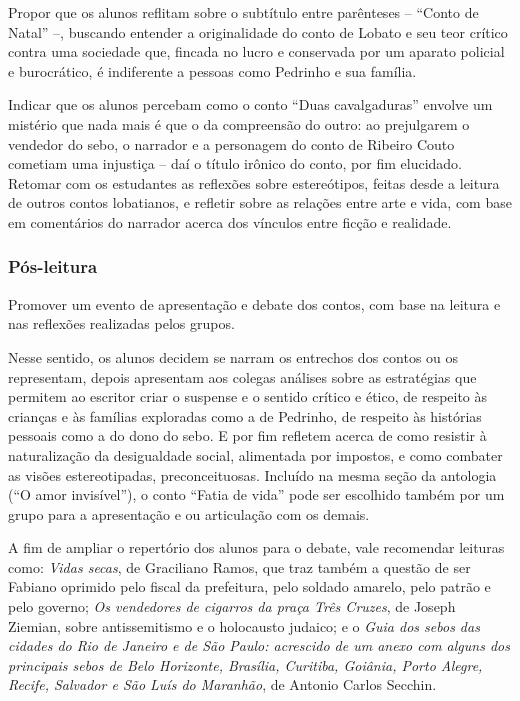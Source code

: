 \documentclass[12pt]{extarticle}
\begin{document}
Propor que os alunos reflitam sobre o subtítulo entre parênteses --
``Conto de Natal'' --, buscando entender a originalidade do conto de
Lobato e seu teor crítico contra uma sociedade que, fincada no lucro e
conservada por um aparato policial e burocrático, é indiferente a
pessoas como Pedrinho e sua família.

Indicar que os alunos percebam como o conto ``Duas cavalgaduras''
envolve um mistério que nada mais é que o da compreensão do outro: ao
prejulgarem o vendedor do sebo, o narrador e a personagem do conto de
Ribeiro Couto cometiam uma injustiça -- daí o título irônico do conto,
por fim elucidado. Retomar com os estudantes as reflexões sobre
estereótipos, feitas desde a leitura de outros contos lobatianos, e
refletir sobre as relações entre arte e vida, com base em comentários do
narrador acerca dos vínculos entre ficção e realidade.

\subsubsection{Pós-leitura}

Promover um evento de apresentação e debate dos contos, com base na
leitura e nas reflexões realizadas pelos grupos.

Nesse sentido, os alunos decidem se narram os entrechos dos contos ou os
representam, depois apresentam aos colegas análises sobre as estratégias
que permitem ao escritor criar o suspense e o sentido crítico e ético,
de respeito às crianças e às famílias exploradas como a de Pedrinho, de
respeito às histórias pessoais como a do dono do sebo. E por fim
refletem acerca de como resistir à naturalização da desigualdade social,
alimentada por impostos, e como combater as visões estereotipadas,
preconceituosas. Incluído na mesma seção da antologia (``O amor
invisível''), o conto ``Fatia de vida'' pode ser escolhido também por um
grupo para a apresentação e ou articulação com os demais.

A fim de ampliar o repertório dos alunos para o debate, vale recomendar
leituras como: \emph{Vidas secas}, de Graciliano Ramos, que traz também
a questão de ser Fabiano oprimido pelo fiscal da prefeitura, pelo
soldado amarelo, pelo patrão e pelo governo; \emph{Os vendedores de
cigarros da praça Três Cruzes}, de Joseph Ziemian, sobre antissemitismo
e o holocausto judaico; e o \emph{Guia dos sebos das cidades do Rio de
Janeiro e de São Paulo: acrescido de um anexo com alguns dos principais
sebos de Belo Horizonte, Brasília, Curitiba, Goiânia, Porto Alegre,
Recife, Salvador e São Luís do Maranhão}, de Antonio Carlos Secchin.
\end{document}
